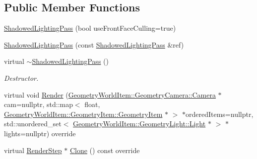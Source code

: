 \subsection*{Public Member Functions}
\begin{DoxyCompactItemize}
\item 
\mbox{\hyperlink{class_geometry_engine_1_1_geometry_render_step_1_1_shadowed_lighting_pass_a16b97807a606bb5ac276e6c9c6e5f745}{Shadowed\+Lighting\+Pass}} (bool use\+Front\+Face\+Culling=true)
\item 
\mbox{\hyperlink{class_geometry_engine_1_1_geometry_render_step_1_1_shadowed_lighting_pass_abf51ceddfb91cb0749f15074cc067e12}{Shadowed\+Lighting\+Pass}} (const \mbox{\hyperlink{class_geometry_engine_1_1_geometry_render_step_1_1_shadowed_lighting_pass}{Shadowed\+Lighting\+Pass}} \&ref)
\item 
\mbox{\label{class_geometry_engine_1_1_geometry_render_step_1_1_shadowed_lighting_pass_a023b4f4a44fd25c1e0f6695a604b1f72}} 
virtual \mbox{\hyperlink{class_geometry_engine_1_1_geometry_render_step_1_1_shadowed_lighting_pass_a023b4f4a44fd25c1e0f6695a604b1f72}{$\sim$\+Shadowed\+Lighting\+Pass}} ()
\begin{DoxyCompactList}\small\item\em Destructor. \end{DoxyCompactList}\item 
virtual void \mbox{\hyperlink{class_geometry_engine_1_1_geometry_render_step_1_1_shadowed_lighting_pass_ad188a4d3f33fb153459cf3483ff3df23}{Render}} (\mbox{\hyperlink{class_geometry_engine_1_1_geometry_world_item_1_1_geometry_camera_1_1_camera}{Geometry\+World\+Item\+::\+Geometry\+Camera\+::\+Camera}} $\ast$cam=nullptr, std\+::map$<$ float, \mbox{\hyperlink{class_geometry_engine_1_1_geometry_world_item_1_1_geometry_item_1_1_geometry_item}{Geometry\+World\+Item\+::\+Geometry\+Item\+::\+Geometry\+Item}} $\ast$ $>$ $\ast$ordered\+Items=nullptr, std\+::unordered\+\_\+set$<$ \mbox{\hyperlink{class_geometry_engine_1_1_geometry_world_item_1_1_geometry_light_1_1_light}{Geometry\+World\+Item\+::\+Geometry\+Light\+::\+Light}} $\ast$ $>$ $\ast$lights=nullptr) override
\item 
virtual \mbox{\hyperlink{class_geometry_engine_1_1_geometry_render_step_1_1_render_step}{Render\+Step}} $\ast$ \mbox{\hyperlink{class_geometry_engine_1_1_geometry_render_step_1_1_shadowed_lighting_pass_a73176d6860aee0903034eeaf93edb40d}{Clone}} () const override
\end{DoxyCompactItemize}
